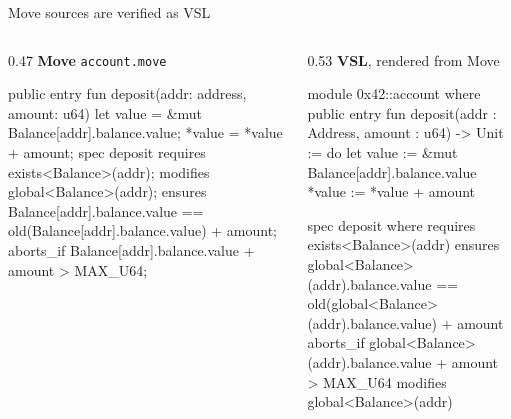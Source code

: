 \documentclass[aspectratio=169,11pt]{beamer}
\begin{document}
\begin{frame}[fragile]{Move sources are verified as VSL}
  \begin{columns}[T]
    \begin{column}{0.47\textwidth}
      \textbf{Move} \hfill {\scriptsize\texttt{account.move}}
\begin{MoveSmall}
public entry fun deposit(addr: address,
                         amount: u64) {
  let value = &mut Balance[addr].balance.value;
  *value = *value + amount;
}
spec deposit {
  requires exists<Balance>(addr);
  modifies global<Balance>(addr);
  ensures Balance[addr].balance.value
    == old(Balance[addr].balance.value) + amount;
  aborts_if Balance[addr].balance.value
    + amount > MAX_U64;
}
\end{MoveSmall}
    \end{column}
    \begin{column}{0.53\textwidth}
      \textbf{VSL}, rendered from Move
\begin{LeanSmall}
module 0x42::account where
  public entry fun deposit(addr : Address,
      amount : u64) -> Unit := do
    let value := &mut Balance[addr].balance.value
    *value := *value + amount

  spec deposit where
    requires exists<Balance>(addr)
    ensures global<Balance>(addr).balance.value
      == old(global<Balance>(addr).balance.value)
         + amount
    aborts_if global<Balance>(addr).balance.value
      + amount > MAX_U64
    modifies global<Balance>(addr)
\end{LeanSmall}
    \end{column}
  \end{columns}
\end{frame}
\end{document}
